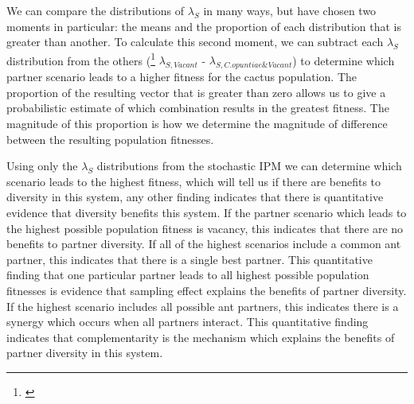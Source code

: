 \documentclass[11pt]{article}
\newcommand{\ali}[2]{{\color{blue}{#1}}\footnote{\textit{\color{blue}{#2}}}}
\begin{document}
We can compare the distributions of $\lambda_{S}$ in many ways, but have chosen two moments in particular: the means and the proportion of each distribution that is greater than another.
To calculate this second moment, we can subtract each $\lambda_{S}$ distribution from the others (\ali{e.g.}{This notation may need to be revised somewhat} $\lambda_{S,Vacant}$ - $\lambda_{S,C. opuntiae \& Vacant}$) to determine which partner scenario leads to a higher fitness for the cactus population. 
The proportion of the resulting vector that is greater than zero allows us to give a probabilistic estimate of which combination results in the greatest fitness. 
The magnitude of this proportion is how we determine the magnitude of difference between the resulting population fitnesses. 

Using only the $\lambda_S$ distributions from the stochastic IPM we can determine which scenario leads to the highest fitness, which will tell us if there are benefits to diversity in this system, any other finding indicates that there is quantitative evidence that diversity benefits this system. 
If the partner scenario which leads to the highest possible population fitness is vacancy, this indicates that there are no benefits to partner diversity.
If all of the highest scenarios include a common ant partner, this indicates that there is a single best partner. 
This quantitative finding that one particular partner leads to all highest possible population fitnesses is evidence that sampling effect explains the benefits of partner diversity.
If the highest scenario includes all possible ant partners, this indicates there is a synergy which occurs when all partners interact.
This quantitative finding indicates that complementarity is the mechanism which explains the benefits of partner diversity in this system.
\end{document}
